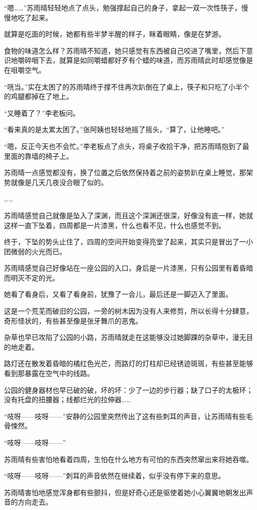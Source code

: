 “嗯……”苏雨晴轻轻地点了点头，勉强撑起自己的身子，拿起一双一次性筷子，慢慢地吃了起来。

就算是吃面的时候，她都有些半梦半醒的样子，眯着眼睛，像是在梦游。

食物的味道怎么样？苏雨晴不知道，她只感觉有东西被自己咬进了嘴里，然后下意识地嚼碎咽下去，就算是如同嚼蜡都好歹有个蜡的味道，而苏雨晴此时却感觉像是在咀嚼空气。

“咣当。”实在太困了的苏雨晴终于撑不住再次趴倒在了桌上，筷子和只吃了小半个的鸡腿都掉在了地上。

“又睡着了？”李老板问。

“看来真的是太累太困了。”张阿姨也轻轻地摇了摇头，“算了，让他睡吧。”

“嗯，反正今天也不会忙。”李老板点了点头，将桌子收拾干净，把苏雨晴抱到了最里面的靠墙的椅子上。

苏雨晴一点感觉都没有，换了位置之后依然保持着之前的姿势趴在桌上睡觉，那架势就像是几天几夜没合眼了似的。

……

苏雨晴感觉自己就像是坠入了深渊，而且这个深渊还很深，好像没有底一样，她就这样一直下坠着，四周都是一片漆黑，什么也看不见，什么也感觉不到。

终于，下坠的势头止住了，四周的空间开始变得亮堂了起来，其实只是冒出了一小团微弱的火光而已。

苏雨晴感觉自己好像站在一座公园的入口，身后是一片漆黑，只有公园里有着昏暗而明灭不定的光。

她看了看身后，又看了看身前，犹豫了一会儿，最后还是一脚迈入了里面。

这是一个荒芜而破旧的公园，一旁的树木因为没有人来修剪，所以长得十分肆意，奇形怪状的，有些甚至像是张牙舞爪的恶鬼。

杂草也早已攻陷了公园的小路，苏雨晴就走在这能够没过她脚踝的杂草中，漫无目的地走着。

路灯还在散发着昏暗的橘红色光芒，而路灯的灯柱却已经锈迹斑斑，有些甚至能够看到那暴露在空气中的线路。

公园的健身器材也早已破的破，坏的坏：少了一边的步行器；缺了口子的太极环；没有托盘的扭腰器；线都烂光的拉伸器……

“吱呀——吱呀——”安静的公园里突然传出了这有些刺耳的声音，让苏雨晴有些毛骨悚然。

“吱呀——吱呀——”

苏雨晴有些害怕地看着四周，生怕在什么地方有可怕的东西突然窜出来将她吞噬。

“吱呀——吱呀——”刺耳的声音依然在继续着，似乎没有停下来的意思。

苏雨晴害怕地感觉浑身都有些颤抖，但是好奇心还是驱使着她小心翼翼地朝发出声音的方向走去。

